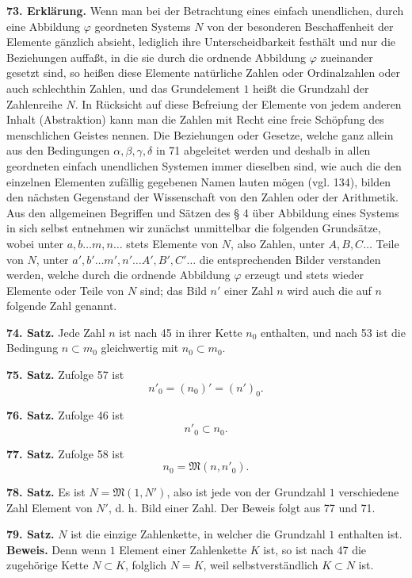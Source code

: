 \documentclass[11pt]{article}
\newcommand{\Mf}{\mathfrak{M}}
\newcommand{\partof}{\mathrel{\subset}}
\begin{document}
\noindent\textbf{73. Erklärung.} Wenn man bei der Betrachtung eines einfach unendlichen, durch eine Abbildung $\varphi$ geordneten Systems $N$ von der besonderen Beschaffenheit der Elemente gänzlich absieht, lediglich ihre Unterscheidbarkeit festhält und nur die Beziehungen auffaßt, in die sie durch die ordnende Abbildung $\varphi$ zueinander gesetzt sind, so heißen diese Elemente natürliche Zahlen oder Ordinalzahlen oder auch schlechthin Zahlen, und das Grundelement $1$ heißt die Grundzahl der Zahlenreihe $N$. In Rücksicht auf diese Befreiung der Elemente von jedem anderen Inhalt (Abstraktion) kann man die Zahlen mit Recht eine freie Schöpfung des menschlichen Geistes nennen. Die Beziehungen oder Gesetze, welche ganz allein aus den Bedingungen $\alpha,\beta,\gamma,\delta$ in 71 abgeleitet werden und deshalb in allen geordneten einfach unendlichen Systemen immer dieselben sind, wie auch die den einzelnen Elementen zufällig gegebenen Namen lauten mögen (vgl. 134), bilden den nächsten Gegenstand der Wissenschaft von den Zahlen oder der Arithmetik. Aus den allgemeinen Begriffen und Sätzen des § 4 über Abbildung eines Systems in sich selbst entnehmen wir zunächst unmittelbar die folgenden Grundsätze, wobei unter $a,b\ldots m,n\ldots$ stets Elemente von $N$, also Zahlen, unter $A,B,C\ldots$ Teile von $N$, unter $a',b'\ldots m',n'\ldots A',B',C'\ldots$ die entsprechenden Bilder verstanden werden, welche durch die ordnende Abbildung $\varphi$ erzeugt und stets wieder Elemente oder Teile von $N$ sind; das Bild $n'$ einer Zahl $n$ wird auch die auf $n$ folgende Zahl genannt.

\noindent\textbf{74. Satz.} Jede Zahl $n$ ist nach 45 in ihrer Kette $n_0$ enthalten, und nach 53 ist die Bedingung $n\partof m_0$ gleichwertig mit $n_0\partof m_0$.

\noindent\textbf{75. Satz.} Zufolge 57 ist
\[
n'_0=(n_0)'=(n')_0.
\]

\noindent\textbf{76. Satz.} Zufolge 46 ist
\[
n'_0\partof n_0.
\]

\noindent\textbf{77. Satz.} Zufolge 58 ist
\[
n_0=\Mf(n,n'_0).
\]

\noindent\textbf{78. Satz.} Es ist $N=\Mf(1,N')$, also ist jede von der Grundzahl $1$ verschiedene Zahl Element von $N'$, d. h. Bild einer Zahl. Der Beweis folgt aus 77 und 71.

\noindent\textbf{79. Satz.} $N$ ist die einzige Zahlenkette, in welcher die Grundzahl $1$ enthalten ist. \textbf{Beweis.} Denn wenn $1$ Element einer Zahlenkette $K$ ist, so ist nach 47 die zugehörige Kette $N\partof K$, folglich $N=K$, weil selbstverständlich $K\partof N$ ist.
\end{document}
